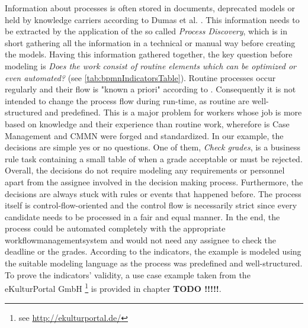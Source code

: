 Information about processes is often stored in documents, deprecated models or held by knowledge carriers according to Dumas et al. \cite{Dumas2013}. This information needs to be extracted by the application of the so called \textit{Process Discovery}, which is in short gathering all the information in a technical or manual way before creating the models. Having this information gathered together, the key question before modeling is \textit{Does the work consist of routine elements which can be optimized or even automated?} (see \ref{tab:bpmnIndicatorsTable}). Routine processes occur regularly and their flow is "known a priori" according to \cite{Zeising_2014}. Consequently it is not intended to change the process flow during run-time, as routine are well-structured and predefined. This is a major problem for workers whose job is more based on knowledge and their experience than routine work, wherefore is Case Management and CMMN were forged and standardized. 
In our example, the decisions are simple yes or no questions. One of them, \textit{Check grades}, is a business rule task containing a small table of when a grade acceptable or must be rejected. Overall, the decisions do not require modeling any requirements or personnel apart from the assignee involved in the decision making process. Furthermore, the decisions are always stuck with rules or events that happened before. The process itself is control-flow-oriented and the control flow is necessarily strict since every candidate needs to be processed in a fair and equal manner. In the end, the process could be automated completely with the appropriate workflowmanagementsystem and would not need any assignee to check the deadline or the grades. 
According to the indicators, the example is modeled using the suitable modeling language as the process was predefined and well-structured. To prove the indicators' validity, a use case example taken from the eKulturPortal GmbH \footnote{see \url{http://ekulturportal.de/}} is provided in chapter \textbf{TODO !!!!!}. 


